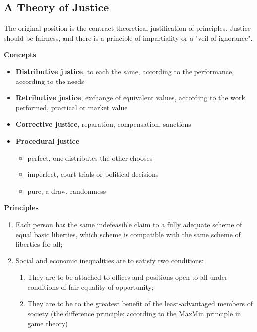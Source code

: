 \documentclass[11pt]{article}
\theoremstyle{definition}
\begin{document}
\clearpage

\subsection{A Theory of Justice}
The original position is the contract-theoretical justification of principles. Justice should be fairness, and there is a principle of impartiality or a "veil of ignorance".

\vspace{1em}
\noindent
\textbf{Concepts}
\begin{itemize}
	\item \textbf{Distributive justice}, to each the same, according to the performance, according to the needs
	\item \textbf{Retributive justice}, exchange of equivalent values, according to the work performed, practical or market value
	\item \textbf{Corrective justice}, reparation, compensation, sanctions
	\item \textbf{Procedural justice}
	\begin{itemize}
		\item perfect, one distributes the other chooses
		\item imperfect, court trials or political decisions
		\item pure, a draw, randomness
	\end{itemize}
\end{itemize}
\vspace{1em}
\noindent
\textbf{Principles}
\begin{enumerate}
	\item Each person has the same indefeasible claim to a fully adequate scheme of equal basic liberties, which scheme is compatible with the same scheme of liberties for all;
	\item Social and economic inequalities are to satisfy two conditions:
	\begin{enumerate}
		\item They are to be attached to offices and positions open to all under conditions of fair equality of opportunity;
		\item They are to be to the greatest benefit of the least-advantaged members of society (the difference principle; according to the MaxMin principle in game theory)
	\end{enumerate}
\end{enumerate}
\end{document}
